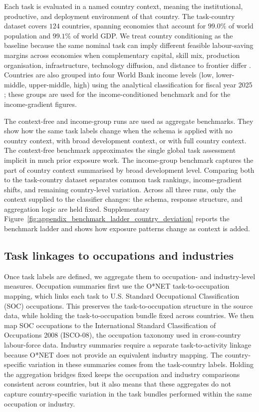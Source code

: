 \documentclass[11pt]{article}
\begin{document}
Each task is evaluated in a named country context, meaning the institutional, productive, and deployment environment of that country. The task-country dataset covers $124$ countries, spanning economies that account for $99.0\%$ of world population and $99.1\%$ of world GDP. We treat country conditioning as the baseline because the same nominal task can imply different feasible labour-saving margins across economies when complementary capital, skill mix, production organisation, infrastructure, technology diffusion, and distance to frontier differ \citep{CaselliColeman2001Computers,CominHobijn2010,AcemogluAghionZilibotti2006DistanceToFrontier,CaunedoKellerShin2021}. Countries are also grouped into four World Bank income levels (low, lower-middle, upper-middle, high) using the analytical classification for fiscal year 2025 \citep{worldbank_incomegroups}; these groups are used for the income-conditioned benchmark and for the income-gradient figures.

The context-free and income-group runs are used as aggregate benchmarks. They show how the same task labels change when the schema is applied with no country context, with broad development context, or with full country context. The context-free benchmark approximates the single global task assessment implicit in much prior exposure work. The income-group benchmark captures the part of country context summarised by broad development level. Comparing both to the task-country dataset separates common task rankings, income-gradient shifts, and remaining country-level variation. Across all three runs, only the context supplied to the classifier changes: the schema, response structure, and aggregation logic are held fixed. Supplementary Figure~\ref{fig:appendix_benchmark_ladder_country_deviation} reports the benchmark ladder and shows how exposure patterns change as context is added.


\FloatBarrier
\subsection{Task linkages to occupations and industries}
\label{sec:data_classifications}
\label{sec:methods_occupation}
\label{sec:methods_industry}
Once task labels are defined, we aggregate them to occupation- and industry-level measures. Occupation summaries first use the O*NET task-to-occupation mapping, which links each task to U.S. Standard Occupational Classification (SOC) occupations. This preserves the task-to-occupation structure in the source data, while holding the task-to-occupation bundle fixed across countries. We then map SOC occupations to the International Standard Classification of Occupations 2008 (ISCO-08), the occupation taxonomy used in cross-country labour-force data. Industry summaries require a separate task-to-activity linkage because O*NET does not provide an equivalent industry mapping. The country-specific variation in these summaries comes from the task-country labels. Holding the aggregation bridges fixed keeps the occupation and industry comparisons consistent across countries, but it also means that these aggregates do not capture country-specific variation in the task bundles performed within the same occupation or industry.
\end{document}
